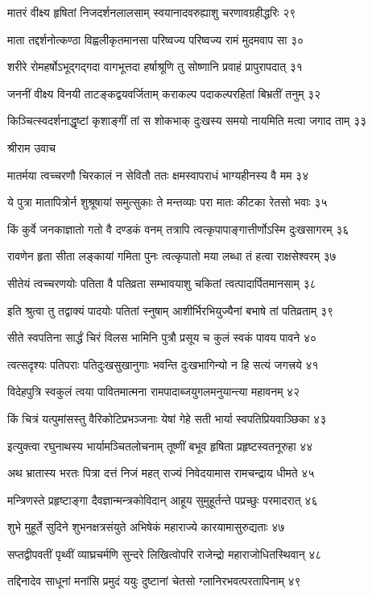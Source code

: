 मातरं वीक्ष्य हृषितां निजदर्शनलालसाम्
स्वयानादवरुह्याशु चरणावग्रहीद्धरिः २९

माता तद्दर्शनोत्कण्ठा विह्वलीकृतमानसा
परिष्वज्य परिष्वज्य रामं मुदमवाप सा ३०

शरीरे रोमहर्षोऽभूद्गद्गदा वागभूत्तदा
हर्षाश्रूणि तु सोष्णानि प्रवाहं प्रापुरापदात् ३१

जननीं वीक्ष्य विनयी ताटङ्कद्वयवर्जिताम्
कराकल्प पदाकल्परहितां बिभ्रतीं तनुम् ३२

किञ्चित्स्वदर्शनाद्धृष्टां कृशाङ्गीं तां स शोकभाक्
दुःखस्य समयो नायमिति मत्वा जगाद ताम् ३३

श्रीराम उवाच

मातर्मया त्वच्चरणौ चिरकालं न सेवितौ
ततः क्षमस्वापराधं भाग्यहीनस्य वै मम ३४

ये पुत्रा मातापित्रोर्न शुश्रूषायां समुत्सुकाः
ते मन्तव्याः परा मातः कीटका रेतसो भवाः ३५

किं कुर्वे जनकाज्ञातो गतो वै दण्डकं वनम्
तत्रापि त्वत्कृपापाङ्गात्तीर्णोऽस्मि दुःखसागरम् ३६

रावणेन हृता सीता लङ्कायां गमिता पुनः
त्वत्कृपातो मया लब्धा तं हत्वा राक्षसेश्वरम् ३७

सीतेयं त्वच्चरणयोः पतिता वै पतिव्रता
सम्भावयाशु चकितां त्वत्पादार्पितमानसाम् ३८

इति श्रुत्वा तु तद्वाक्यं पादयोः पतितां स्नुषाम्
आशीर्भिरभियुज्यैनां बभाषे तां पतिव्रताम् ३९

सीते स्वपतिना सार्द्धं चिरं विलस भामिनि
पुत्रौ प्रसूय च कुलं स्वकं पावय पावने ४०

त्वत्सदृश्यः पतिपराः पतिदुःखसुखानुगाः
भवन्ति दुःखभागिन्यो न हि सत्यं जगत्त्रये ४१

विदेहपुत्रि स्वकुलं त्वया पावितमात्मना
रामपादाब्जयुगलमनुयान्त्या महावनम् ४२

किं चित्रं यत्पुमांसस्तु वैरिकोटिप्रभञ्जनाः
येषां गेहे सती भार्या स्वपतिप्रियवाञ्छिका ४३

इत्युक्त्वा रघुनाथस्य भार्यामञ्चितलोचनाम्
तूष्णीं बभूव हृषिता प्रहृष्टस्वतनूरुहा ४४

अथ भ्रातास्य भरतः पित्रा दत्तं निजं महत्
राज्यं निवेदयामास रामचन्द्राय धीमते ४५

मन्त्रिणस्ते प्रहृष्टाङ्गा दैवज्ञान्मन्त्रकोविदान्
आहूय सुमुहूर्तन्ते पप्रच्छुः परमादरात् ४६

शुभे मुहूर्ते सुदिने शुभनक्षत्रसंयुते
अभिषेकं महाराज्ये कारयामासुरुद्यताः ४७

सप्तद्वीपवतीं पृथ्वीं व्याघ्रचर्मणि सुन्दरे
लिखित्वोपरि राजेन्द्रो महाराजोधितस्थिवान् ४८

तद्दिनादेव साधूनां मनांसि प्रमुदं ययुः
दुष्टानां चेतसो ग्लानिरभवत्परतापिनाम् ४९

